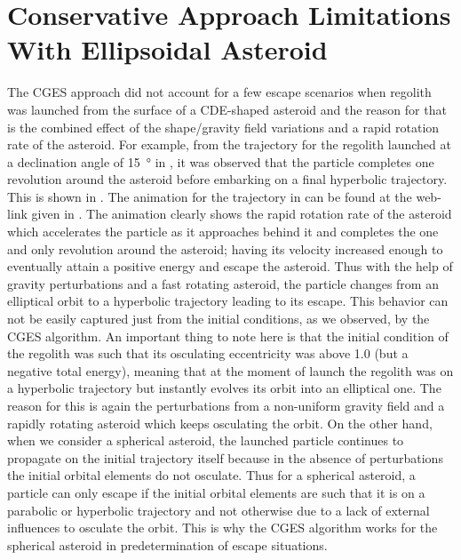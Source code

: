 \section{Conservative Approach Limitations With Ellipsoidal Asteroid}
\label{sec:conservative_escape_cde_limitations}
The \gls{CGES} approach did not account for a few escape scenarios when regolith was launched from the surface of a \gls{CDE}-shaped asteroid and the reason for that is the combined effect of the shape/gravity field variations and a rapid rotation rate of the asteroid. For example, from the trajectory for the regolith launched at a declination angle of \SI{15}{\degree} in , it was observed that the particle completes one revolution around the asteroid before embarking on a final hyperbolic trajectory. This is shown in .
%
\newline\newline
%
The animation for the trajectory in  can be found at the web-link given in . The animation clearly shows the rapid rotation rate of the asteroid which accelerates the particle as it approaches behind it and completes the one and only revolution around the asteroid; having its velocity increased enough to eventually attain a positive energy and escape the asteroid. Thus with the help of gravity perturbations and a fast rotating asteroid, the particle changes from an elliptical orbit to a hyperbolic trajectory leading to its escape. This behavior can not be easily captured just from the initial conditions, as we observed, by the \gls{CGES} algorithm.
%
\newline\newline
%
An important thing to note here is that the initial condition of the regolith was such that its osculating eccentricity was above 1.0 (but a negative total energy), meaning that at the moment of launch the regolith was on a hyperbolic trajectory but instantly evolves its orbit into an elliptical one. The reason for this is again the perturbations from a non-uniform gravity field and a rapidly rotating asteroid which keeps osculating the orbit. On the other hand, when we consider a spherical asteroid, the launched particle continues to propagate on the initial trajectory itself because in the absence of perturbations the initial orbital elements do not osculate. Thus for a spherical asteroid, a particle can only escape if the initial orbital elements are such that it is on a parabolic or hyperbolic trajectory and not otherwise due to a lack of external influences to osculate the orbit. This is why the \gls{CGES} algorithm works for the spherical asteroid in predetermination of escape situations.
